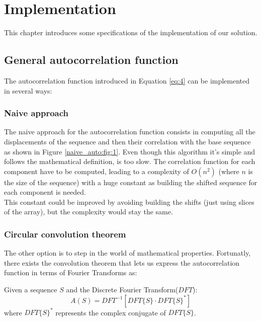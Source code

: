 \chapter{Implementation}
  This chapter introduces some specifications of the implementation
  of our solution.\\


  \section{General autocorrelation function}
    The autocorrelation function introduced in Equation \eqref{eq:4} can be
    implemented in several ways:

      \subsection{Naive approach}
        The naive approach for the autocorrelation function consists in
        computing all the displacements of the sequence and then
        their correlation with the base sequence as shown in Figure
        \ref{naive_auto:fig:1}. Even though this algorithm it's simple and
        follows the mathematical definition, is too slow. The correlation function
        for each component have to be computed, leading to a
        complexity of $O(n^{2})$ (where $n$ is the size of the sequence) with a
        huge constant as building the shifted sequence for each
        component is needed.\\

        This constant could be improved by avoiding building the shifts (just
        using slices of the array), but the complexity would stay the
        same.

      \subsection{Circular convolution theorem}
        The other option is to step in the world of mathematical properties.
        Fortunatly, there exists the convolution theorem\cite{golomb_ref} that
        lets us express the autocorrelation function in terms of Fourier
        Transforms as:
        \begin{theorem}
          Given a sequence $S$ and the Discrete Fourier Transform($DFT$):
          \begin{equation}
            A(S) = DFT^{-1}[DFT\{S\} · DFT\{S\}^{*}]
          \end{equation}
          where $DFT\{S\}^{*}$ represents the complex conjugate of $DFT\{S\}$.
        \end{theorem}

